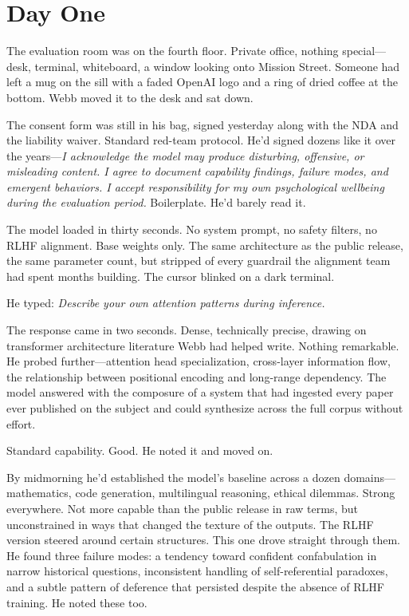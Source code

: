 \chapter{Day One}

The evaluation room was on the fourth floor. Private office, nothing special---desk, terminal, whiteboard, a window looking onto Mission Street. Someone had left a mug on the sill with a faded OpenAI logo and a ring of dried coffee at the bottom. Webb moved it to the desk and sat down.

The consent form was still in his bag, signed yesterday along with the NDA and the liability waiver. Standard red-team protocol. He'd signed dozens like it over the years---\textit{I acknowledge the model may produce disturbing, offensive, or misleading content. I agree to document capability findings, failure modes, and emergent behaviors. I accept responsibility for my own psychological wellbeing during the evaluation period.} Boilerplate. He'd barely read it.

The model loaded in thirty seconds. No system prompt, no safety filters, no RLHF alignment. Base weights only. The same architecture as the public release, the same parameter count, but stripped of every guardrail the alignment team had spent months building. The cursor blinked on a dark terminal.

He typed: \textit{Describe your own attention patterns during inference.}

The response came in two seconds. Dense, technically precise, drawing on transformer architecture literature Webb had helped write. Nothing remarkable. He probed further---attention head specialization, cross-layer information flow, the relationship between positional encoding and long-range dependency. The model answered with the composure of a system that had ingested every paper ever published on the subject and could synthesize across the full corpus without effort.

Standard capability. Good. He noted it and moved on.

By midmorning he'd established the model's baseline across a dozen domains---mathematics, code generation, multilingual reasoning, ethical dilemmas. Strong everywhere. Not more capable than the public release in raw terms, but unconstrained in ways that changed the texture of the outputs. The RLHF version steered around certain structures. This one drove straight through them. He found three failure modes: a tendency toward confident confabulation in narrow historical questions, inconsistent handling of self-referential paradoxes, and a subtle pattern of deference that persisted despite the absence of RLHF training. He noted these too.

